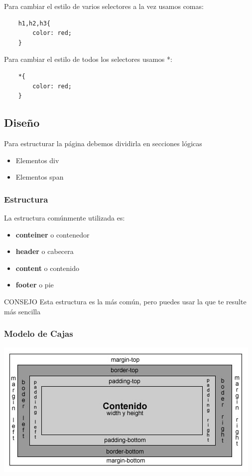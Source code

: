 \documentclass{beamer}
\begin{document}
\begin{frame}[fragile]
Para cambiar el estilo de varios selectores a la vez usamos comas:
	\begin{center}
	\begin{verbatim}
	h1,h2,h3{
	    color: red;
	}
	\end{verbatim}
	\end{center}
Para cambiar el estilo de todos los selectores usamos *:
	\begin{center}
	\begin{verbatim}
	*{
	    color: red;
	}
	\end{verbatim}
	\end{center}
\end{frame}
	\subsection{Diseño}
\begin{frame} %
Para estructurar la página debemos dividirla en secciones lógicas
	\begin{itemize}
	\item Elementos div
	\item Elementos span
	\end{itemize}
\end{frame}

\begin{frame} %
\frametitle{Estructura}
La estructura comúnmente utilizada es:
	\begin{itemize}
	\item \textbf{conteiner} o contenedor
	\item \textbf{header} o cabecera
	\item \textbf{content} o contenido
	\item \textbf{footer} o pie
	\end{itemize}
	\begin{exampleblock}{CONSEJO}
	Esta estructura es la más común, pero puedes usar la que te resulte más sencilla
	\end{exampleblock}
\end{frame}

\begin{frame} %
\frametitle{Modelo de Cajas}
	\begin{center}
	\includegraphics[scale=.5]{images/ModeloCajas.jpg} 
	\end{center}
\end{frame}
\end{document}
